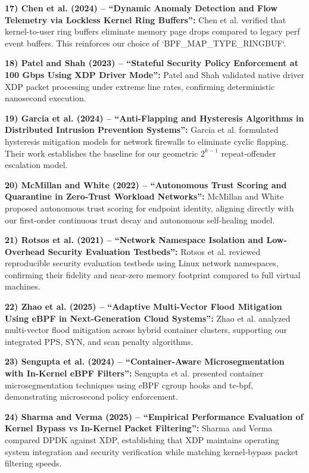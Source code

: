 \documentclass[conference]{IEEEtran}
\begin{document}
\noindent
\textbf{17) Chen et al. (2024) -- ``Dynamic Anomaly Detection and Flow Telemetry via Lockless Kernel Ring Buffers'':} 
Chen et al. verified that kernel-to-user ring buffers eliminate memory page drops compared to legacy perf event buffers. This reinforces our choice of `BPF\_MAP\_TYPE\_RINGBUF`.

\noindent
\textbf{18) Patel and Shah (2023) -- ``Stateful Security Policy Enforcement at 100 Gbps Using XDP Driver Mode'':} 
Patel and Shah validated native driver XDP packet processing under extreme line rates, confirming deterministic nanosecond execution.

\noindent
\textbf{19) Garcia et al. (2024) -- ``Anti-Flapping and Hysteresis Algorithms in Distributed Intrusion Prevention Systems'':} 
Garcia et al. formulated hysteresis mitigation models for network firewalls to eliminate cyclic flapping. Their work establishes the baseline for our geometric $2^{k-1}$ repeat-offender escalation model.

\noindent
\textbf{20) McMillan and White (2022) -- ``Autonomous Trust Scoring and Quarantine in Zero-Trust Workload Networks'':} 
McMillan and White proposed autonomous trust scoring for endpoint identity, aligning directly with our first-order continuous trust decay and autonomous self-healing model.

\noindent
\textbf{21) Rotsos et al. (2021) -- ``Network Namespace Isolation and Low-Overhead Security Evaluation Testbeds'':} 
Rotsos et al. reviewed reproducible security evaluation testbeds using Linux network namespaces, confirming their fidelity and near-zero memory footprint compared to full virtual machines.

\noindent
\textbf{22) Zhao et al. (2025) -- ``Adaptive Multi-Vector Flood Mitigation Using eBPF in Next-Generation Cloud Systems'':} 
Zhao et al. analyzed multi-vector flood mitigation across hybrid container clusters, supporting our integrated PPS, SYN, and scan penalty algorithms.

\noindent
\textbf{23) Sengupta et al. (2024) -- ``Container-Aware Microsegmentation with In-Kernel eBPF Filters'':} 
Sengupta et al. presented container microsegmentation techniques using eBPF cgroup hooks and tc-bpf, demonstrating microsecond policy enforcement.

\noindent
\textbf{24) Sharma and Verma (2025) -- ``Empirical Performance Evaluation of Kernel Bypass vs In-Kernel Packet Filtering'':} 
Sharma and Verma compared DPDK against XDP, establishing that XDP maintains operating system integration and security verification while matching kernel-bypass packet filtering speeds.
\end{document}
